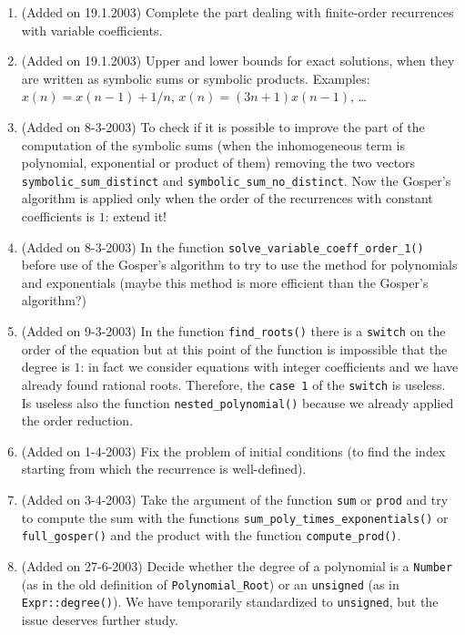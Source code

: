 \documentclass[a4paper]{article}
\begin{document}
\begin{enumerate}
\item (Added on 19.1.2003)
Complete the part dealing with finite-order recurrences with variable
coefficients.

\item (Added on 19.1.2003)
Upper and lower bounds for exact solutions, when they are written as
symbolic sums or symbolic products.
Examples: $x(n) = x(n-1) + 1/n$, $x(n) = (3n+1) x(n-1)$, \dots

\item (Added on 8-3-2003)
To check if it is possible to improve the part of the computation of the
symbolic sums (when the inhomogeneous term is polynomial, exponential or
product of them) removing the two vectors \texttt{symbolic\_sum\_distinct} and
\texttt{symbolic\_sum\_no\_distinct}.
Now the Gosper's algorithm is applied only when the order of the recurrences
with constant coefficients is $1$: extend it! 

\item (Added on 8-3-2003)
In the function \texttt{solve\_variable\_coeff\_order\_1()} before use of the
Gosper's algorithm to try to use the method for polynomials and
exponentials (maybe this method is more efficient than the
Gosper's algorithm?)

\item (Added on 9-3-2003)
In the function \texttt{find\_roots()} there is a \texttt{switch} on the
order of the equation but at this point of the function is impossible
that the degree is $1$: in fact we consider equations with integer
coefficients and we have already found rational roots.
Therefore, the \texttt{case 1} of the \texttt{switch} is useless.
Is useless also the function \texttt{nested\_polynomial()} because
we already applied the order reduction. 

\item (Added on 1-4-2003)
Fix the problem of initial conditions (to find the index starting from which
the recurrence is well-defined).

\item (Added on 3-4-2003)
Take the argument of the function \verb/sum/ or \verb/prod/ and try to
compute the sum with the functions \verb/sum_poly_times_exponentials()/
or \verb/full_gosper()/ and the product with the function
\verb/compute_prod()/.

\item (Added on 27-6-2003)
Decide whether the degree of a polynomial is a \verb/Number/ (as in
the old definition of \verb/Polynomial_Root/) or an \verb/unsigned/
(as in \verb/Expr::degree()/).
We have temporarily standardized to \verb/unsigned/, but the issue
deserves further study.
\end{enumerate}
\end{document}
